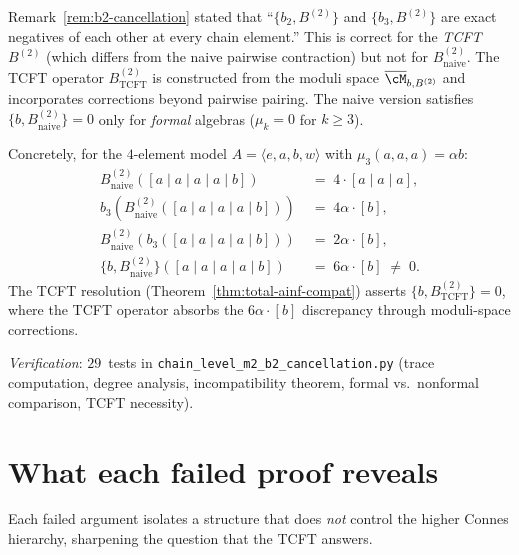 \begin{remark}
\label{rem:b2-cancellation-correction}
Remark~\ref{rem:b2-cancellation} stated that
``$\{b_2, B^{(2)}\}$ and $\{b_3, B^{(2)}\}$ are exact negatives
of each other at every chain element.''  This is correct for
the \emph{TCFT} $B^{(2)}$ (which differs from the naive
pairwise contraction) but not for $B^{(2)}_{\mathrm{naive}}$.
The TCFT operator $B^{(2)}_{\mathrm{TCFT}}$ is constructed
from the moduli space $\overline{\cM}_{b, B^{(2)}}$ and
incorporates corrections beyond pairwise pairing.  The naive
version satisfies $\{b, B^{(2)}_{\mathrm{naive}}\} = 0$ only
for \emph{formal} algebras ($\mu_k = 0$ for $k \geq 3$).

Concretely, for the $4$-element model
$A = \langle e, a, b, w \rangle$ with
$\mu_3(a,a,a) = \alpha b$:
\begin{align*}
 B^{(2)}_{\mathrm{naive}}([a \mid a \mid a \mid a \mid b])
 &\;=\; 4 \cdot [a \mid a \mid a], \\
 b_3(B^{(2)}_{\mathrm{naive}}([a \mid a \mid a \mid a \mid b]))
 &\;=\; 4\alpha \cdot [b], \\
 B^{(2)}_{\mathrm{naive}}(b_3([a \mid a \mid a \mid a \mid b]))
 &\;=\; 2\alpha \cdot [b], \\
 \{b, B^{(2)}_{\mathrm{naive}}\}
 ([a \mid a \mid a \mid a \mid b])
 &\;=\; 6\alpha \cdot [b] \;\neq\; 0.
\end{align*}
The TCFT resolution (Theorem~\ref{thm:total-ainf-compat})
asserts $\{b, B^{(2)}_{\mathrm{TCFT}}\} = 0$, where the TCFT
operator absorbs the $6\alpha \cdot [b]$ discrepancy through
moduli-space corrections.

\noindent\textit{Verification}: $29$~tests in
\texttt{chain\_level\_m2\_b2\_cancellation.py}
(trace computation, degree analysis, incompatibility theorem,
formal vs.\ nonformal comparison, TCFT necessity).
\end{remark}


\section{What each failed proof reveals}
\label{sec:m3b2-what-failures-reveal}

Each failed argument isolates a structure that does \emph{not}
control the higher Connes hierarchy, sharpening the question that
the TCFT answers.

